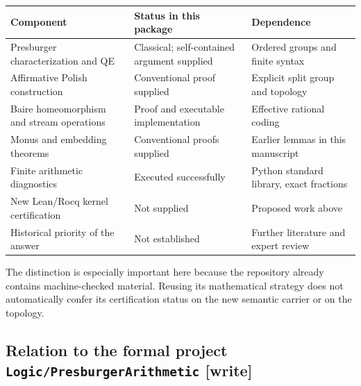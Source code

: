 \documentclass[11pt]{article}
\numberwithin{equation}{section}
\theoremstyle{definition}
\theoremstyle{remark}
\newcommand{\writetag}{\textup{\textsf{\small[write]}}}
\newcommand{\fn}[1]{\nolinkurl{#1}}
\begin{document}
\begin{center}
\begin{tabularx}{\textwidth}{@{}P{0.30\textwidth}>{\raggedright\arraybackslash}X>{\raggedright\arraybackslash}X@{}}
\toprule
Component & Status in this package & Dependence\\
\midrule
Presburger characterization and QE & Classical; self-contained argument supplied & Ordered groups and finite syntax\\
Affirmative Polish construction & Conventional proof supplied & Explicit split group and topology\\
Baire homeomorphism and stream operations & Proof and executable implementation & Effective rational coding\\
Monus and embedding theorems & Conventional proofs supplied & Earlier lemmas in this manuscript\\
Finite arithmetic diagnostics & Executed successfully & Python standard library, exact fractions\\
New Lean/Rocq kernel certification & Not supplied & Proposed work above\\
Historical priority of the answer & Not established & Further literature and expert review\\
\bottomrule
\end{tabularx}
\end{center}

The distinction is especially important here because the repository
already contains machine-checked material. Reusing its mathematical
strategy does not automatically confer its certification status on the
new semantic carrier or on the topology.

\subsection{\texorpdfstring{Relation to the formal project \fn{Logic/PresburgerArithmetic} \writetag}{Relation to the formal project Logic/PresburgerArithmetic [write]}}\label{pma:pr:sec:formalrepo}
\end{document}
